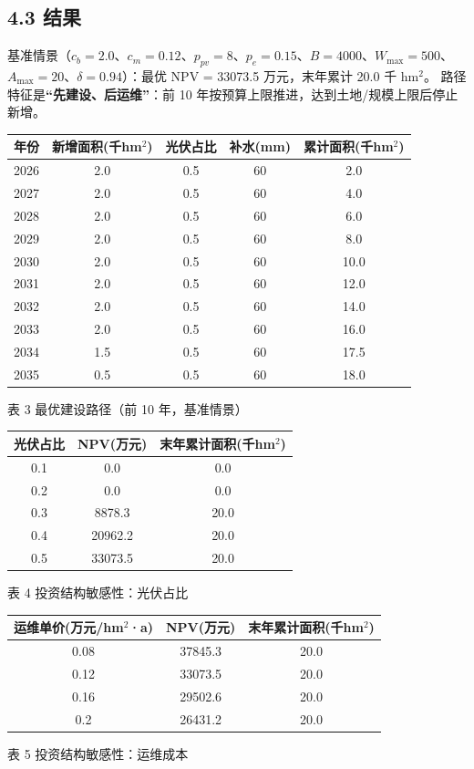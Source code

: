 \documentclass[11pt,a4paper]{ctexart}
\begin{document}
\subsection*{4.3 结果}
基准情景（$c_b=2.0$、$c_m=0.12$、$p_{pv}=8$、$p_e=0.15$、$B=4000$、$W_{\max}=500$、
$A_{\max}=20$、$\delta=0.94$）：最优 NPV = 33073.5 万元，末年累计 20.0 千 hm$^2$。
路径特征是\textbf{“先建设、后运维”}：前 10 年按预算上限推进，达到土地/规模上限后停止新增。
\begin{table}[H]\centering\small
\begin{tabular}{|c|c|c|c|c|}
\toprule
年份 & 新增面积(千hm$^2$) & 光伏占比 & 补水(mm) & 累计面积(千hm$^2$) \\
\midrule
2026 & 2.0 & 0.5 & 60 & 2.0 \\
2027 & 2.0 & 0.5 & 60 & 4.0 \\
2028 & 2.0 & 0.5 & 60 & 6.0 \\
2029 & 2.0 & 0.5 & 60 & 8.0 \\
2030 & 2.0 & 0.5 & 60 & 10.0 \\
2031 & 2.0 & 0.5 & 60 & 12.0 \\
2032 & 2.0 & 0.5 & 60 & 14.0 \\
2033 & 2.0 & 0.5 & 60 & 16.0 \\
2034 & 1.5 & 0.5 & 60 & 17.5 \\
2035 & 0.5 & 0.5 & 60 & 18.0 \\
\bottomrule
\end{tabular}
\begin{center}\small 表 3  最优建设路径（前 10 年，基准情景）\end{center}
\end{table}\begin{table}[H]\centering\small
\begin{tabular}{|c|c|c|}
\toprule
光伏占比 & NPV(万元) & 末年累计面积(千hm$^2$) \\
\midrule
0.1 & 0.0 & 0.0 \\
0.2 & 0.0 & 0.0 \\
0.3 & 8878.3 & 20.0 \\
0.4 & 20962.2 & 20.0 \\
0.5 & 33073.5 & 20.0 \\
\bottomrule
\end{tabular}
\begin{center}\small 表 4  投资结构敏感性：光伏占比\end{center}
\end{table}\begin{table}[H]\centering\small
\begin{tabular}{|c|c|c|}
\toprule
运维单价(万元/hm$^2$·a) & NPV(万元) & 末年累计面积(千hm$^2$) \\
\midrule
0.08 & 37845.3 & 20.0 \\
0.12 & 33073.5 & 20.0 \\
0.16 & 29502.6 & 20.0 \\
0.2 & 26431.2 & 20.0 \\
\bottomrule
\end{tabular}
\begin{center}\small 表 5  投资结构敏感性：运维成本\end{center}
\end{table}
\end{document}
